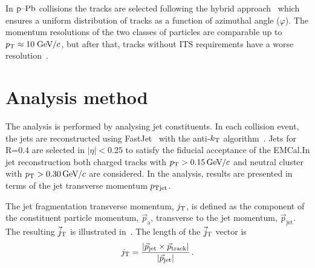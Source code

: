 In $\mbox{p--Pb}$ collisions the tracks are selected following the hybrid approach~\cite{hybridExplanation} which ensures a uniform distribution of tracks as a function of azimuthal angle ($\varphi$). The momentum resolutions of the two classes of particles are comparable up to $p_{\rm T} \approx 10\;\mathrm{GeV}\kern-0.05em/\kern-0.02em c$, but after that, tracks without ITS requirements have a worse resolution~\cite{alicePerformance,aliceBackgroundFluctuation}.

\section{Analysis method}
\label{sec:methods}

The analysis is performed by analysing jet constituents. In each collision event, the jets are reconstructed using FastJet~\cite{fastjet} with the anti-$k_{\rm T}$ algorithm~\cite{antikt}. Jets for R=0.4 are selected in $\left| \eta \right| < 0.25 $ to satisfy the fiducial acceptance of the EMCal.In jet reconstruction both charged tracks with $p_{\rm T}>0.15\,\mathrm{GeV}\kern-0.05em/\kern-0.02em c$ and neutral cluster with $p_{\rm T}>0.30\,\mathrm{GeV}\kern-0.05em/\kern-0.02em c$ are considered. In the analysis, results are presented in terms of the jet transverse momentum $p_{\rm Tjet}$.

The jet fragmentation transverse momentum, $j_{\rm T}$, is defined as the component of the constituent particle momentum, $\vec{p}_{\mathrm{a}}$, transverse to the jet momentum, $\vec{p}_{\mathrm{jet}}$. The resulting $\vec{j}_{\rm T}$ is illustrated in~. The length of the $\vec{j}_{\rm T}$ vector is
  \begin{equation}
    j_{\rm T} = \frac{|\vec{p}_{\mathrm{jet}} \times \vec{p}_{\mathrm{track}}|}{|\vec{p}_{\mathrm{jet}}|} \,.
  \label{eq:jtdefinition}
  \end{equation}

